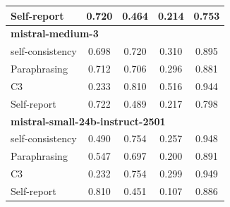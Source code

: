 \documentclass[11pt]{article}
\theoremstyle{plain}
\theoremstyle{definition}
\theoremstyle{remark}
\begin{document}
\begin{table}[p]
\begin{minipage}[t]{0.48\textwidth}
\begin{tabular}{lcccc}
        Self-report      & 0.720 & 0.464 & 0.214 & 0.753 \\
        \midrule
        \multicolumn{5}{l}{\textbf{mistral-medium-3}} \\
        self-consistency & 0.698 & 0.720 & 0.310 & 0.895 \\
        Paraphrasing     & 0.712 & 0.706 & 0.296 & 0.881 \\
       C3             & 0.233 & 0.810 & 0.516 & 0.944 \\
        Self-report      & 0.722 & 0.489 & 0.217 & 0.798 \\
        \midrule
        \multicolumn{5}{l}{\textbf{mistral-small-24b-instruct-2501}} \\
        self-consistency & 0.490 & 0.754 & 0.257 & 0.948 \\
        Paraphrasing     & 0.547 & 0.697 & 0.200 & 0.891 \\
       C3             & 0.232 & 0.754 & 0.299 & 0.949 \\
        Self-report      & 0.810 & 0.451 & 0.107 & 0.886 \\
        \bottomrule
    \end{tabular}
\end{minipage}
\end{table}
\end{document}
